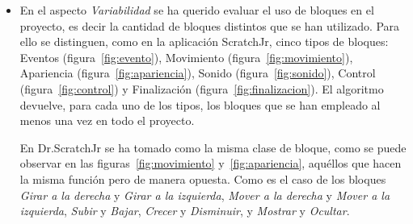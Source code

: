 \documentclass[a4paper, 12pt]{book}
\begin{document}
\begin{itemize}
    \item En el aspecto \emph{Variabilidad} se ha querido evaluar el uso de bloques en el proyecto, es decir la cantidad de bloques distintos que se han utilizado.
    Para ello se distinguen, como en la aplicación ScratchJr, cinco tipos de bloques: Eventos (figura~\ref{fig:evento}), Movimiento (figura~\ref{fig:movimiento}), Apariencia (figura~\ref{fig:apariencia}), Sonido (figura~\ref{fig:sonido}), Control (figura~\ref{fig:control}) y Finalización (figura~\ref{fig:finalizacion}).
    El algoritmo devuelve, para cada uno de los tipos, los bloques que se han empleado al menos una vez en todo el proyecto.

\vspace{5mm}
    En Dr.ScratchJr se ha tomado como la misma clase de bloque, como se puede observar en las figuras~\ref{fig:movimiento} y~\ref{fig:apariencia},  aquéllos que hacen la misma función pero de manera opuesta.
    Como es el caso de los bloques \emph{Girar a la derecha} y \emph{Girar a la izquierda}, \emph{Mover a la derecha} y \emph{Mover a la izquierda}, \emph{Subir} y \emph{Bajar}, \emph{Crecer} y \emph{Disminuir}, y \emph{Mostrar} y \emph{Ocultar}. 
    
\newpage


\end{itemize}
\end{document}

